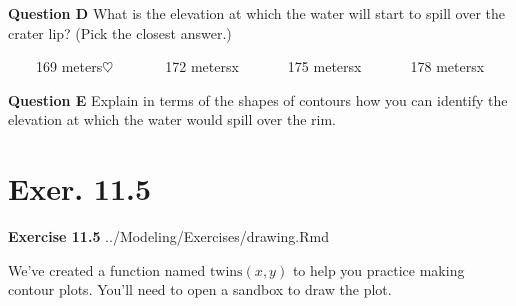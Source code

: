 \documentclass[
  letterpaper,
  DIV=11,
  numbers=noendperiod,
  oneside]{article}
\begin{document}
\begin{multicols}{2}
\begin{table}
\begin{minipage}[t]{\linewidth}
{}

\end{minipage}%
\newline
\begin{minipage}[t]{\linewidth}

{\centering 

\textbf{Question D} What is the elevation at which the water will start
to spill over the crater lip? (Pick the closest answer.)

~~~~{169 meters{\(\heartsuit\ \)}}~~~~~~~{172 meters{x}}~~~~~~~{175
meters{x}}~~~~~~~{178 meters{x}}

}

\end{minipage}%
\newline
\begin{minipage}[t]{\linewidth}

{\centering 

\textbf{Question E} Explain in terms of the shapes of contours how you
can identify the elevation at which the water would spill over the rim.

}

\end{minipage}%
\newline
\begin{minipage}[t]{\linewidth}

{\centering 

\hypertarget{exer.-11.5}{%
\section*{Exer. 11.5}\label{exer.-11.5}}

\textbf{Exercise 11.5} ../Modeling/Exercises/drawing.Rmd

}

\end{minipage}%
\newline
\begin{minipage}[t]{\linewidth}

{\centering 

We've created a function named \(\text{twins}(x,y)\) to help you
practice making contour plots. You'll need to open a sandbox to draw the
plot.

}

\end{minipage}%
\newline
\begin{minipage}[t]{\linewidth}


\end{minipage}
\end{table}
\end{multicols}
\end{document}
